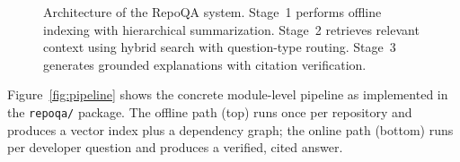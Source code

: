 \documentclass[11pt]{article}
\begin{document}
\begin{figure}[ht]
{
}
\caption{Architecture of the RepoQA system. Stage~1 performs offline indexing with hierarchical summarization. Stage~2 retrieves relevant context using hybrid search with question-type routing. Stage~3 generates grounded explanations with citation verification.}
\label{fig:architecture}
\end{figure}


Figure~\ref{fig:pipeline} shows the concrete module-level pipeline as implemented in the \texttt{repoqa/} package. The offline path (top) runs once per repository and produces a vector index plus a dependency graph; the online path (bottom) runs per developer question and produces a verified, cited answer.
\end{document}
